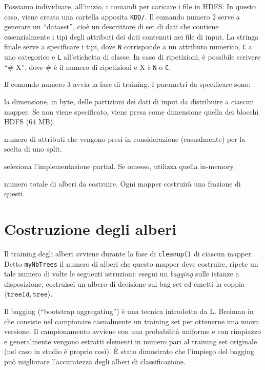 \documentclass[a4paper,11pt,twoside,openright,fleqn]{book}
\newcommand{\code}[1]{\texttt{#1}}
\newcommand{\pair}[2]{\langle #1, #2 \rangle}
\begin{document}
Possiamo individuare, all'inizio, i comandi per caricare i file in HDFS. In questo caso, viene creata una cartella apposita \code{KDD/}. Il comando numero 2 serve a generare un ``dataset'', cioè un descrittore di set di dati che contiene essenzialmente i tipi degli attributi dei dati contenuti nei file di input. La stringa finale serve a specificare i tipi, dove \code N corrisponde a un attributo numerico, \code C a uno categorico e \code L all'etichetta di classe. In caso di ripetizioni, è possibile scrivere ``\# X'', dove \# è il numero di ripetizioni e X è \code N o \code C.

Il comando numero 3 avvia la fase di training. I parametri da specificare sono:
\begin{description}[font=\normalfont\ttfamily]
\item[-Dmapred.max.split.size] la dimensione, in byte, delle partizioni dei dati di input da distribuire a ciascun mapper. Se non viene specificato, viene presa come dimensione quella dei blocchi HDFS (64 MB).
\item[-{}-selection] numero di attributi che vengono presi in considerazione (casualmente) per la scelta di uno split.
\item[-{}-partial] seleziona l'implementazione partial. Se omesso, utilizza quella in-memory.
\item[-{}-nbtrees] numero totale di alberi da costruire. Ogni mapper costruirà una frazione di questi.
\end{description}

\section{Costruzione degli alberi}

Il training degli alberi avviene durante la fase di \code{cleanup()} di ciascun mapper. Detto \code{myNbTrees} il numero di alberi che questo mapper deve costruire, ripete un tale numero di volte le seguenti istruzioni: esegui un \emph{bagging} sulle istanze a disposizione, costruisci un albero di decisione sul bag set ed emetti la coppia $\pair{\code{treeId}}{\code{tree}}$.

Il bagging (``bootstrap aggregating'') è una tecnica introdotta da L. Breiman in \cite{Breiman:1996} che consiste nel campionare casualmente un training set per ottenerne una nuova versione. Il campionamento avviene con una probabilità uniforme e con rimpiazzo e generalmente vengono estratti elementi in numero pari al training set originale (nel caso in studio è proprio così). È stato dimostrato che l'impiego del bagging può migliorare l'accuratezza degli alberi di classificazione.
\end{document}
